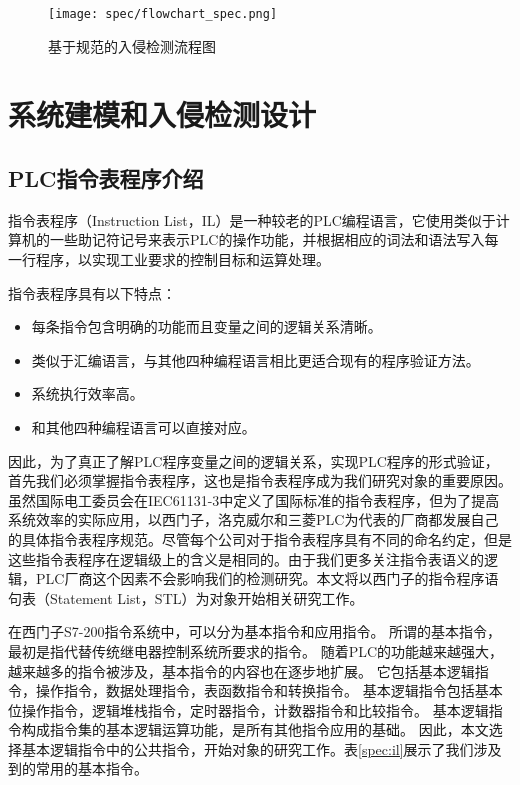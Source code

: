 \begin{figure}[!htb]
\centering
\texttt{[image: spec/flowchart\_spec.png]}
\caption{基于规范的入侵检测流程图}
\label{fig21}
\end{figure}

\section{系统建模和入侵检测设计}
\label{sec:matheq}

\subsection{PLC指令表程序介绍}

指令表程序（Instruction  List，IL）是一种较老的PLC编程语言，它使用类似于计算机的一些助记符记号来表示PLC的操作功能，并根据相应的词法和语法写入每一行程序，以实现工业要求的控制目标和运算处理。

指令表程序具有以下特点：

\begin{itemize}
	\item 每条指令包含明确的功能而且变量之间的逻辑关系清晰。 
	\item 类似于汇编语言，与其他四种编程语言相比更适合现有的程序验证方法。 
	\item 系统执行效率高。
	\item 和其他四种编程语言可以直接对应。
\end{itemize}

因此，为了真正了解PLC程序变量之间的逻辑关系，实现PLC程序的形式验证，首先我们必须掌握指令表程序，这也是指令表程序成为我们研究对象的重要原因。虽然国际电工委员会在IEC61131-3中定义了国际标准的指令表程序，但为了提高系统效率的实际应用，以西门子，洛克威尔和三菱PLC为代表的厂商都发展自己的具体指令表程序规范。尽管每个公司对于指令表程序具有不同的命名约定，但是这些指令表程序在逻辑级上的含义是相同的。由于我们更多关注指令表语义的逻辑，PLC厂商这个因素不会影响我们的检测研究。本文将以西门子的指令程序语句表（Statement  List，STL）为对象开始相关研究工作。

在西门子S7-200指令系统中，可以分为基本指令和应用指令。 所谓的基本指令，最初是指代替传统继电器控制系统所要求的指令。 随着PLC的功能越来越强大，越来越多的指令被涉及，基本指令的内容也在逐步地扩展。 它包括基本逻辑指令，操作指令，数据处理指令，表函数指令和转换指令。 基本逻辑指令包括基本位操作指令，逻辑堆栈指令，定时器指令，计数器指令和比较指令。 基本逻辑指令构成指令集的基本逻辑运算功能，是所有其他指令应用的基础。 因此，本文选择基本逻辑指令中的公共指令，开始对象的研究工作。表\ref{spec:il}展示了我们涉及到的常用的基本指令。

